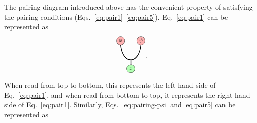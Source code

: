 \documentclass[a4paper,11pt]{article}
\theoremstyle{theorem}
\theoremstyle{remark}
\begin{document}
The pairing diagram introduced above has the convenient property of satisfying the pairing conditions (Eqs.~\eqref{eq:pair1}–\eqref{eq:pair5}). Eq.~\eqref{eq:pair1} can be represented as 
\begin{equation}
     \begin{aligned}
				\begin{tikzpicture}
					\draw[black, line width=1.0pt]  (-0.5, 1) .. controls (-0.4, 0) and (0.4, 0) .. (0.5, 1);
					\draw[black, line width=1.0pt]  (0,0.23)--(0,-0.23);
				 \filldraw[green!30, draw=black] 
         (0,-.2) circle (0.2);
         \node at (0, -.2) {$\scriptstyle x$};
        \filldraw[red!30, draw=black] 
         (-0.5,1.2) circle (0.2);
         \node at (-0.5, 1.2) {$\scriptstyle \varphi$};
    \filldraw[red!30, draw=black] 
        (0.5,1.2) circle (0.2);
           \node at (0.5, 1.2) {$\scriptstyle \psi$};	
    \end{tikzpicture}
	\end{aligned}.
\end{equation}
When read from top to bottom, this represents the left-hand side of Eq.~\eqref{eq:pair1}, and when read from bottom to top, it represents the right-hand side of Eq.~\eqref{eq:pair1}. Similarly, Eqs.~\eqref{eq:pairing-psi} and \eqref{eq:pair5} can be represented as
\end{document}
